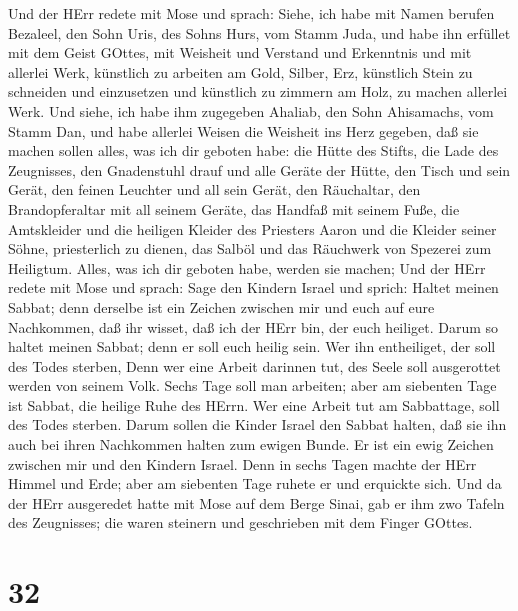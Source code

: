  Und der HErr redete mit Mose und sprach: 
Siehe, ich habe mit Namen berufen Bezaleel, den Sohn Uris, des Sohns
Hurs, vom Stamm Juda,  und habe ihn erfüllet mit dem Geist
GOttes, mit Weisheit und Verstand und Erkenntnis und mit allerlei Werk,
 künstlich zu arbeiten am Gold, Silber, Erz, 
künstlich Stein zu schneiden und einzusetzen und künstlich zu zimmern am
Holz, zu machen allerlei Werk.  Und siehe, ich habe ihm
zugegeben Ahaliab, den Sohn Ahisamachs, vom Stamm Dan, und habe allerlei
Weisen die Weisheit ins Herz gegeben, daß sie machen sollen alles, was
ich dir geboten habe:  die Hütte des Stifts, die Lade des
Zeugnisses, den Gnadenstuhl drauf und alle Geräte der Hütte,
 den Tisch und sein Gerät, den feinen Leuchter und all sein
Gerät, den Räuchaltar,  den Brandopferaltar mit all seinem
Geräte, das Handfaß mit seinem Fuße,  die Amtskleider und
die heiligen Kleider des Priesters Aaron und die Kleider seiner Söhne,
priesterlich zu dienen,  das Salböl und das Räuchwerk von
Spezerei zum Heiligtum. Alles, was ich dir geboten habe, werden sie
machen;  Und der HErr redete mit Mose und sprach:
 Sage den Kindern Israel und sprich: Haltet meinen Sabbat;
denn derselbe ist ein Zeichen zwischen mir und euch auf eure Nachkommen,
daß ihr wisset, daß ich der HErr bin, der euch heiliget. 
Darum so haltet meinen Sabbat; denn er soll euch heilig sein. Wer ihn
entheiliget, der soll des Todes sterben, Denn wer eine Arbeit darinnen
tut, des Seele soll ausgerottet werden von seinem Volk. 
Sechs Tage soll man arbeiten; aber am siebenten Tage ist Sabbat, die
heilige Ruhe des HErrn. Wer eine Arbeit tut am Sabbattage, soll des
Todes sterben.  Darum sollen die Kinder Israel den Sabbat
halten, daß sie ihn auch bei ihren Nachkommen halten zum ewigen Bunde.
 Er ist ein ewig Zeichen zwischen mir und den Kindern
Israel. Denn in sechs Tagen machte der HErr Himmel und Erde; aber am
siebenten Tage ruhete er und erquickte sich.  Und da der
HErr ausgeredet hatte mit Mose auf dem Berge Sinai, gab er ihm zwo
Tafeln des Zeugnisses; die waren steinern und geschrieben mit dem Finger
GOttes.

\hypertarget{section-31}{%
\section{32}\label{section-31}}

